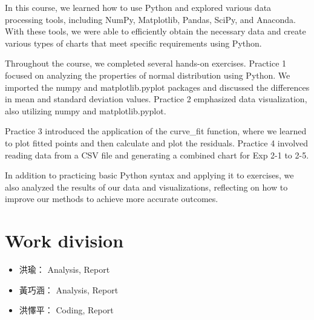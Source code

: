 \documentclass[12pt,a4paper]{article}
\begin{document}
\begin{CJK}{UTF8}{bkai}
\indent In this course, we learned how to use Python and explored various data processing tools, including NumPy, Matplotlib, Pandas, SciPy, and Anaconda. With these tools, we were able to efficiently obtain the necessary data and create various types of charts that meet specific requirements using Python.

\indent Throughout the course, we completed several hands-on exercises. Practice 1 focused on analyzing the properties of normal distribution using Python. We imported the numpy and matplotlib.pyplot packages and discussed the differences in mean and standard deviation values. Practice 2 emphasized data visualization, also utilizing numpy and matplotlib.pyplot.

\indent Practice 3 introduced the application of the curve\_fit function, where we learned to plot fitted points and then calculate and plot the residuals. Practice 4 involved reading data from a CSV file and generating a combined chart for Exp 2-1 to 2-5.

\indent In addition to practicing basic Python syntax and applying it to exercises, we also analyzed the results of our data and visualizations, reflecting on how to improve our methods to achieve more accurate outcomes.


\section{Work division}\label{sec:work}

\begin{itemize}
    \item 洪瑜： Analysis, Report
    \item 黃巧涵： Analysis, Report
    \item 洪懌平： Coding, Report
\end{itemize}


\end{CJK}
\end{document}
